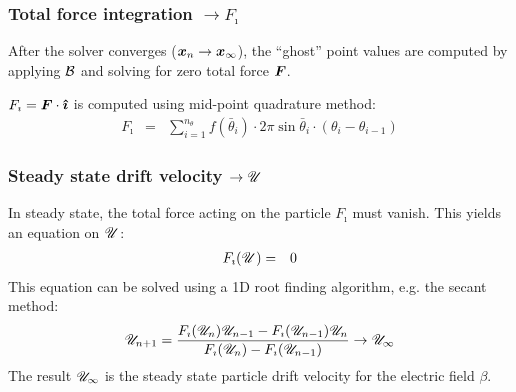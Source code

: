 \subsubsection{Total force integration $\rightarrow F_\imath$}
After the solver converges ($\boldsymbol{x}_n \rightarrow \boldsymbol{x}_\infty$), 
the ``ghost'' point values are computed by applying $\mathcal{B}$ and
solving for zero total force $\boldsymbol{F}$.

$F_\imath = \boldsymbol{F} \cdot \boldsymbol{\hat{\imath}}$ is computed using mid-point quadrature method:
\begin{eqnarray}
F_\imath &=& \sum_{i=1}^{n_\theta} f(\bar\theta_i) \cdot 
              2 \pi \sin\bar\theta_i \cdot (\theta_i - \theta_{i-1})
\end{eqnarray}

\subsubsection{Steady state drift velocity $\rightarrow \mathscr{U}$}
In steady state, the total force acting on the particle $F_\imath$ must vanish.
This yields an equation on $\mathscr{U}$:
\begin{eqnarray}
F_\imath(\mathscr{U}) &=& 0
\end{eqnarray}
This equation can be solved using a 1D root finding algorithm, e.g. the secant method:
\begin{eqnarray}
\mathscr{U}_{n+1} = \frac{F_\imath(\mathscr{U}_{n})\mathscr{U}_{n-1} - F_\imath(\mathscr{U}_{n-1})\mathscr{U}_{n}}
{F_\imath(\mathscr{U}_{n}) - F_\imath(\mathscr{U}_{n-1})} \rightarrow \mathscr{U}_\infty
\end{eqnarray}
The result $\mathscr{U}_\infty$ is the 
steady state particle drift velocity for the electric field $\beta$.

